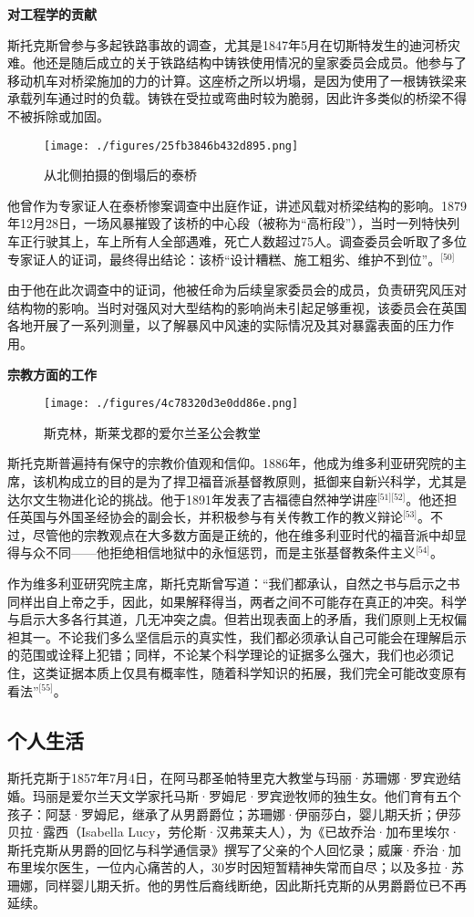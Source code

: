 \textbf{对工程学的贡献}

斯托克斯曾参与多起铁路事故的调查，尤其是1847年5月在切斯特发生的迪河桥灾难。他还是随后成立的关于铁路结构中铸铁使用情况的皇家委员会成员。他参与了移动机车对桥梁施加的力的计算。这座桥之所以坍塌，是因为使用了一根铸铁梁来承载列车通过时的负载。铸铁在受拉或弯曲时较为脆弱，因此许多类似的桥梁不得不被拆除或加固。
\begin{figure}[ht]
\centering
\texttt{[image: ./figures/25fb3846b432d895.png]}
\caption{从北侧拍摄的倒塌后的泰桥} \label{fig_QZstks_8}
\end{figure}
他曾作为专家证人在泰桥惨案调查中出庭作证，讲述风载对桥梁结构的影响。1879年12月28日，一场风暴摧毁了该桥的中心段（被称为“高桁段”），当时一列特快列车正行驶其上，车上所有人全部遇难，死亡人数超过75人。调查委员会听取了多位专家证人的证词，最终得出结论：该桥“设计糟糕、施工粗劣、维护不到位”。\(^\text{[50]}\)

由于他在此次调查中的证词，他被任命为后续皇家委员会的成员，负责研究风压对结构物的影响。当时对强风对大型结构的影响尚未引起足够重视，该委员会在英国各地开展了一系列测量，以了解暴风中风速的实际情况及其对暴露表面的压力作用。

\textbf{宗教方面的工作}

\begin{figure}[ht]
\centering
\texttt{[image: ./figures/4c78320d3e0dd86e.png]}
\caption{斯克林，斯莱戈郡的爱尔兰圣公会教堂} \label{fig_QZstks_9}
\end{figure}
斯托克斯普遍持有保守的宗教价值观和信仰。1886年，他成为维多利亚研究院的主席，该机构成立的目的是为了捍卫福音派基督教原则，抵御来自新兴科学，尤其是达尔文生物进化论的挑战。他于1891年发表了吉福德自然神学讲座\(^\text{[51][52]}\)。他还担任英国与外国圣经协会的副会长，并积极参与有关传教工作的教义辩论\(^\text{[53]}\)。不过，尽管他的宗教观点在大多数方面是正统的，他在维多利亚时代的福音派中却显得与众不同——他拒绝相信地狱中的永恒惩罚，而是主张基督教条件主义\(^\text{[54]}\)。

作为维多利亚研究院主席，斯托克斯曾写道：“我们都承认，自然之书与启示之书同样出自上帝之手，因此，如果解释得当，两者之间不可能存在真正的冲突。科学与启示大多各行其道，几无冲突之虞。但若出现表面上的矛盾，我们原则上无权偏袒其一。不论我们多么坚信启示的真实性，我们都必须承认自己可能会在理解启示的范围或诠释上犯错；同样，不论某个科学理论的证据多么强大，我们也必须记住，这类证据本质上仅具有概率性，随着科学知识的拓展，我们完全可能改变原有看法”\(^\text{[55]}\)。
\subsection{个人生活}
斯托克斯于1857年7月4日，在阿马郡圣帕特里克大教堂与玛丽·苏珊娜·罗宾逊结婚。玛丽是爱尔兰天文学家托马斯·罗姆尼·罗宾逊牧师的独生女。他们育有五个孩子：阿瑟·罗姆尼，继承了从男爵爵位；苏珊娜·伊丽莎白，婴儿期夭折；伊莎贝拉·露西（Isabella Lucy，劳伦斯·汉弗莱夫人），为《已故乔治·加布里埃尔·斯托克斯从男爵的回忆与科学通信录》撰写了父亲的个人回忆录；威廉·乔治·加布里埃尔医生，一位内心痛苦的人，30岁时因短暂精神失常而自尽；以及多拉·苏珊娜，同样婴儿期夭折。他的男性后裔线断绝，因此斯托克斯的从男爵爵位已不再延续。
